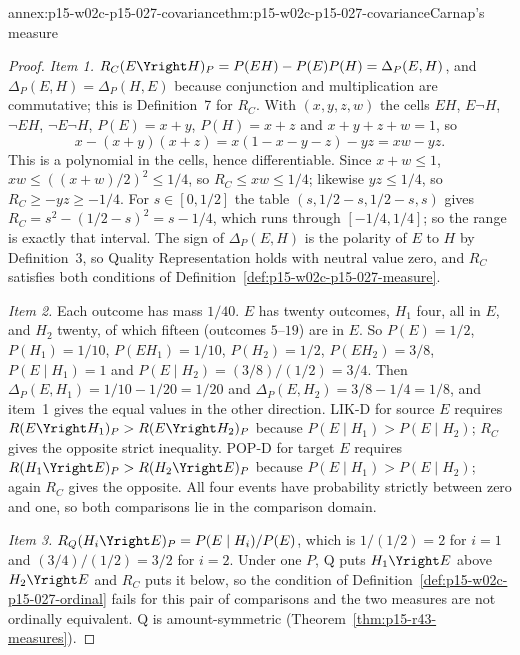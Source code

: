 \begin{annexitem}{annex:p15-w02c-p15-027-covariance}{thm:p15-w02c-p15-027-covariance}{Carnap's measure}
\begin{proof}
\emph{Item 1.} \(R_C(E\Yright H)_P=P(EH)-P(E)P(H)=\Delta_P(E,H)\), and
\(\Delta_P(E,H)=\Delta_P(H,E)\) because conjunction and multiplication
are commutative; this is Definition~7 for \(R_C\). With
\((x,y,z,w)\) the cells \(EH\), \(E\neg H\), \(\neg EH\), \(\neg E\neg H\),
\(P(E)=x+y\), \(P(H)=x+z\) and \(x+y+z+w=1\), so
\[
 x-(x+y)(x+z)=x(1-x-y-z)-yz=xw-yz .
\]
This is a polynomial in the cells, hence differentiable. Since
\(x+w\leq1\), \(xw\leq((x+w)/2)^2\leq1/4\), so \(R_C\leq xw\leq1/4\);
likewise \(yz\leq1/4\), so \(R_C\geq-yz\geq-1/4\). For
\(s\in[0,1/2]\) the table \((s,1/2-s,1/2-s,s)\) gives
\(R_C=s^2-(1/2-s)^2=s-1/4\), which runs through \([-1/4,1/4]\); so the
range is exactly that interval. The sign of \(\Delta_P(E,H)\) is the
polarity of \(E\) to \(H\) by Definition~3, so Quality Representation
holds with neutral value zero, and \(R_C\) satisfies both conditions of
Definition~\ref{def:p15-w02c-p15-027-measure}.

\emph{Item 2.} Each outcome has mass \(1/40\). \(E\) has twenty
outcomes, \(H_1\) four, all in \(E\), and \(H_2\) twenty, of which
fifteen (outcomes \(5\)--\(19\)) are in \(E\). So \(P(E)=1/2\),
\(P(H_1)=1/10\), \(P(EH_1)=1/10\), \(P(H_2)=1/2\), \(P(EH_2)=3/8\),
\(P(E\mid H_1)=1\) and \(P(E\mid H_2)=(3/8)/(1/2)=3/4\). Then
\(\Delta_P(E,H_1)=1/10-1/20=1/20\) and
\(\Delta_P(E,H_2)=3/8-1/4=1/8\), and item~1 gives the equal values in the
other direction. LIK-D for source \(E\) requires
\(R(E\Yright H_1)_P>R(E\Yright H_2)_P\) because
\(P(E\mid H_1)>P(E\mid H_2)\); \(R_C\) gives the opposite strict
inequality. POP-D for target \(E\) requires
\(R(H_1\Yright E)_P>R(H_2\Yright E)_P\) because
\(P(E\mid H_1)>P(E\mid H_2)\); again \(R_C\) gives the opposite. All four
events have probability strictly between zero and one, so both
comparisons lie in the comparison domain.

\emph{Item 3.} \(R_Q(H_i\Yright E)_P=P(E\mid H_i)/P(E)\), which is
\(1/(1/2)=2\) for \(i=1\) and \((3/4)/(1/2)=3/2\) for \(i=2\). Under one
\(P\), Q puts \(H_1\Yright E\) above \(H_2\Yright E\) and \(R_C\) puts it
below, so the condition of
Definition~\ref{def:p15-w02c-p15-027-ordinal} fails for this pair of
comparisons and the two measures are not ordinally equivalent. Q is
amount-symmetric (Theorem~\ref{thm:p15-r43-measures}).
\end{proof}
\end{annexitem}

